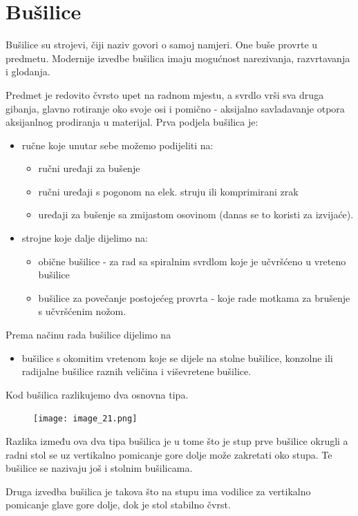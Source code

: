 \documentclass[a4paper,12pt]{article}
\numberwithin{figure}{section}
\begin{document}
\section{Bušilice}
Bušilice su strojevi, čiji naziv govori o samoj namjeri. One buše provrte u predmetu. Modernije izvedbe bušilica imaju mogućnost narezivanja, razvrtavanja i glodanja. \par
Predmet je redovito čvrsto upet na radnom mjestu, a svrdlo vrši sva druga gibanja, glavno rotiranje oko svoje osi i pomično - aksijalno savladavanje otpora aksijanlnog prodiranja u materijal. 
Prva podjela bušilica je:
\begin{itemize}
\item ručne koje unutar sebe možemo podijeliti na:
\begin{itemize}
\item ručni uređaji za bušenje
\item ručni uređaji s pogonom na elek. struju ili komprimirani zrak
\item uređaji za bušenje sa zmijastom osovinom (danas se to koristi za izvijaće).
\end{itemize}
\item strojne koje dalje dijelimo na:
\begin{itemize}
\item obične bušilice - za rad sa spiralnim svrdlom koje je učvršćeno u vreteno bušilice
\item bušilice za povečanje postojećeg provrta - koje rade motkama za brušenje s učvršćenim nožom.
\end{itemize}
\end{itemize} 
Prema načinu rada bušilice dijelimo na
\begin{itemize}
\item bušilice s okomitim vretenom koje se dijele na stolne bušilice, konzolne ili radijalne bušilice raznih veličina i viševretene bušilice.
\end{itemize}
Kod bušilica razlikujemo dva osnovna tipa.
\begin{figure}[!h]
\centering
\texttt{[image: image\_21.png]}
\end{figure}
\FloatBarrier
Razlika između ova dva tipa  bušilica je u tome što je stup prve bušilice okrugli a radni stol se uz vertikalno pomicanje gore dolje može zakretati oko stupa. Te bušilice se nazivaju još i stolnim bušilicama. \par
Druga izvedba bušilica je takova što na stupu ima vodilice za vertikalno pomicanje glave gore dolje, dok je stol stabilno čvrst. \par
\end{document}
